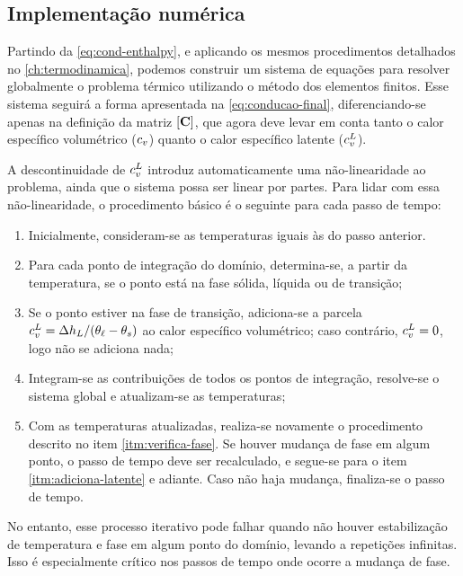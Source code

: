 \documentclass[Tese.tex]{subfiles}
\begin{document}
\subsection{Implementação numérica}\label{sec:implementacao-mudanca-fase}

Partindo da \cref{eq:cond-enthalpy}, e aplicando os mesmos procedimentos detalhados no \cref{ch:termodinamica}, podemos construir um sistema de equações para resolver globalmente o problema térmico utilizando o método dos elementos finitos. Esse sistema seguirá a forma apresentada na \cref{eq:conducao-final}, diferenciando-se apenas na definição da matriz $[\mathbf{C}]$, que agora deve levar em conta tanto o calor específico volumétrico ($c_v$) quanto o calor específico latente ($c_v^L$).

A descontinuidade de $c_v^L$ introduz automaticamente uma não-linearidade ao problema, ainda que o sistema possa ser linear por partes. Para lidar com essa não-linearidade, o procedimento básico é o seguinte para cada passo de tempo: 
\begin{enumerate}
	\item Inicialmente, consideram-se as temperaturas iguais às do passo anterior. 
	\item Para cada ponto de integração do domínio, determina-se, a partir da temperatura, se o ponto está na fase sólida, líquida ou de transição;\label{itm:verifica-fase}
	\item Se o ponto estiver na fase de transição, adiciona-se a parcela $c_v^L = {\Delta h_L}/{(\theta_\ell - \theta_s)}$ ao calor específico volumétrico; caso contrário, $c_v^L = 0$, logo não se adiciona nada;\label{itm:adiciona-latente}
	\item Integram-se as contribuições de todos os pontos de integração, resolve-se o sistema global e atualizam-se as temperaturas;
	\item Com as temperaturas atualizadas, realiza-se novamente o procedimento descrito no item \ref{itm:verifica-fase}. Se houver mudança de fase em algum ponto, o passo de tempo deve ser recalculado, e segue-se para o item \ref{itm:adiciona-latente} e adiante. Caso não haja mudança, finaliza-se o passo de tempo.
\end{enumerate}

No entanto, esse processo iterativo pode falhar quando não houver estabilização de temperatura e fase em algum ponto do domínio, levando a repetições infinitas. Isso é especialmente crítico nos passos de tempo onde ocorre a mudança de fase.%
\end{document}
